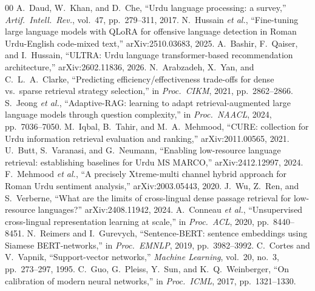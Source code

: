 \documentclass[conference]{IEEEtran}
\begin{document}
\begin{thebibliography}{00}
 A.\ Daud, W.\ Khan, and D.\ Che, ``Urdu language processing: a survey,'' \emph{Artif.\ Intell.\ Rev.}, vol.\ 47, pp.\ 279--311, 2017.
 N.\ Hussain \emph{et al.}, ``Fine-tuning large language models with QLoRA for offensive language detection in Roman Urdu-English code-mixed text,'' arXiv:2510.03683, 2025.
 A.\ Bashir, F.\ Qaiser, and I.\ Hussain, ``ULTRA: Urdu language transformer-based recommendation architecture,'' arXiv:2602.11836, 2026.
 N.\ Arabzadeh, X.\ Yan, and C.\ L.\ A.\ Clarke, ``Predicting efficiency/effectiveness trade-offs for dense vs.\ sparse retrieval strategy selection,'' in \emph{Proc.\ CIKM}, 2021, pp.\ 2862--2866.
 S.\ Jeong \emph{et al.}, ``Adaptive-RAG: learning to adapt retrieval-augmented large language models through question complexity,'' in \emph{Proc.\ NAACL}, 2024, pp.\ 7036--7050.
 M.\ Iqbal, B.\ Tahir, and M.\ A.\ Mehmood, ``CURE: collection for Urdu information retrieval evaluation and ranking,'' arXiv:2011.00565, 2021.
 U.\ Butt, S.\ Varanasi, and G.\ Neumann, ``Enabling low-resource language retrieval: establishing baselines for Urdu MS MARCO,'' arXiv:2412.12997, 2024.
 F.\ Mehmood \emph{et al.}, ``A precisely Xtreme-multi channel hybrid approach for Roman Urdu sentiment analysis,'' arXiv:2003.05443, 2020.
 J.\ Wu, Z.\ Ren, and S.\ Verberne, ``What are the limits of cross-lingual dense passage retrieval for low-resource languages?'' arXiv:2408.11942, 2024.
 A.\ Conneau \emph{et al.}, ``Unsupervised cross-lingual representation learning at scale,'' in \emph{Proc.\ ACL}, 2020, pp.\ 8440--8451.
 N.\ Reimers and I.\ Gurevych, ``Sentence-BERT: sentence embeddings using Siamese BERT-networks,'' in \emph{Proc.\ EMNLP}, 2019, pp.\ 3982--3992.
 C.\ Cortes and V.\ Vapnik, ``Support-vector networks,'' \emph{Machine Learning}, vol.\ 20, no.\ 3, pp.\ 273--297, 1995.
 C.\ Guo, G.\ Pleiss, Y.\ Sun, and K.\ Q.\ Weinberger, ``On calibration of modern neural networks,'' in \emph{Proc.\ ICML}, 2017, pp.\ 1321--1330.
\end{thebibliography}
\end{document}
